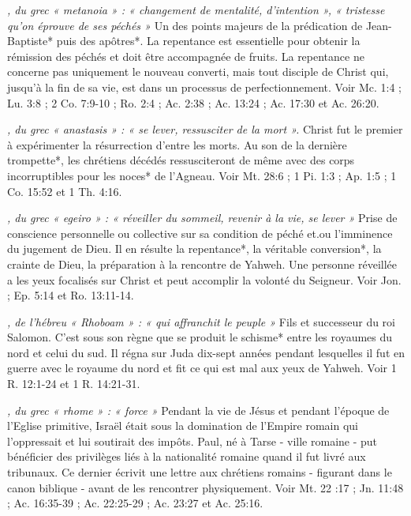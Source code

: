 \begin{multicols}{2}
\textit{, du grec « metanoia » : « changement de mentalité, d'intention », « tristesse qu'on éprouve de ses péchés »}\newline
Un des points majeurs de la prédication de Jean-Baptiste* puis des apôtres*. La repentance est essentielle pour obtenir la rémission des péchés et doit être accompagnée de fruits. La repentance ne concerne pas uniquement le nouveau converti, mais tout disciple de Christ qui, jusqu'à la fin de sa vie, est dans un processus de perfectionnement. Voir Mc. 1:4 ; Lu. 3:8 ; 2 Co. 7:9-10 ; Ro. 2:4 ; Ac. 2:38 ; Ac. 13:24 ; Ac. 17:30 et Ac. 26:20.

\textit{, du grec « anastasis » : « se lever, ressusciter de la mort ».}\newline
Christ fut le premier à expérimenter la résurrection d'entre les morts. Au son de la dernière trompette*, les chrétiens décédés ressusciteront de même avec des corps incorruptibles pour les noces* de l'Agneau. Voir Mt. 28:6 ; 1 Pi. 1:3 ; Ap. 1:5 ; 1 Co. 15:52 et 1 Th. 4:16.

\textit{, du grec « egeiro » : « réveiller du sommeil, revenir à la vie, se lever »}\newline
Prise de conscience personnelle ou collective sur sa condition de péché et.ou l'imminence du jugement de Dieu. Il en résulte la repentance*, la véritable conversion*, la crainte de Dieu, la préparation à la rencontre de Yahweh. Une personne réveillée a les yeux focalisés sur Christ et peut accomplir la volonté du Seigneur. Voir Jon. ; Ep. 5:14 et Ro. 13:11-14.

\textit{, de l'hébreu « Rhoboam » : « qui affranchit le peuple »}\newline
Fils et successeur du roi Salomon. C'est sous son règne que se produit le schisme* entre les royaumes du nord et celui du sud. Il régna sur Juda dix-sept années pendant lesquelles il fut en guerre avec le royaume du nord et fit ce qui est mal aux yeux de Yahweh. Voir 1 R. 12:1-24 et 1 R. 14:21-31.

\textit{, du grec « rhome » : « force »}\newline
Pendant la vie de Jésus et pendant l'époque de l'Eglise primitive, Israël était sous la domination de l'Empire romain qui l'oppressait et lui soutirait des impôts. Paul, né à Tarse - ville romaine - put bénéficier des privilèges liés à la nationalité romaine quand il fut livré aux tribunaux. Ce dernier écrivit une lettre aux chrétiens romains - figurant dans le canon biblique - avant de les rencontrer physiquement. Voir Mt. 22 :17 ; Jn. 11:48 ; Ac. 16:35-39 ; Ac. 22:25-29 ; Ac. 23:27 et Ac. 25:16.


\end{multicols}
